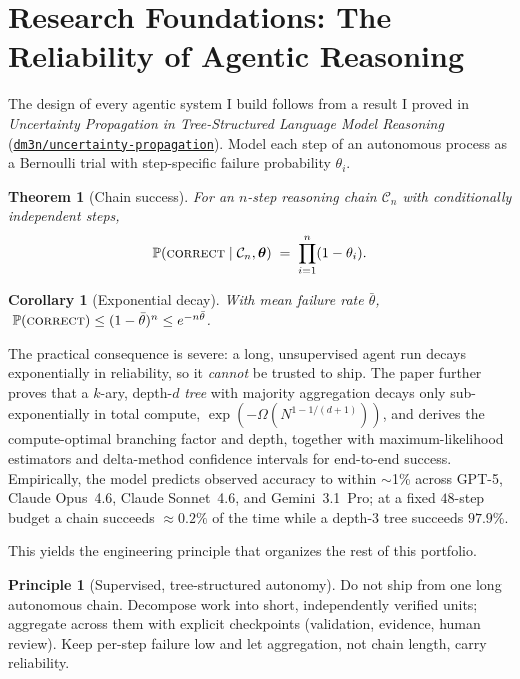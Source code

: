 \documentclass[11pt]{article}
\theoremstyle{plain}
\newtheorem{theorem}{Theorem}
\newtheorem{corollary}{Corollary}
\theoremstyle{definition}
\newtheorem{principle}{Principle}
\newcommand{\repo}[1]{\href{https://github.com/dm3n/#1}{\nolinkurl{dm3n/#1}}}
\begin{document}
\section{Research Foundations: The Reliability of Agentic Reasoning}
\label{sec:research}
The design of every agentic system I build follows from a result I proved in
\emph{Uncertainty Propagation in Tree-Structured Language Model Reasoning}
(\repo{uncertainty-propagation}). Model each step of an autonomous process as a Bernoulli
trial with step-specific failure probability $\theta_i$.

\begin{theorem}[Chain success]
For an $n$-step reasoning chain $\mathcal{C}_n$ with conditionally independent steps,
\[
  \mathbb{P}(\textsc{correct}\mid \mathcal{C}_n,\boldsymbol{\theta}) \;=\; \prod_{i=1}^{n}(1-\theta_i).
\]
\end{theorem}

\begin{corollary}[Exponential decay]
With mean failure rate $\bar\theta$, $\;\mathbb{P}(\textsc{correct}) \le (1-\bar\theta)^n \le e^{-n\bar\theta}$.
\end{corollary}

The practical consequence is severe: a long, unsupervised agent run decays exponentially in
reliability, so it \emph{cannot} be trusted to ship. The paper further proves that a
$k$-ary, depth-$d$ \emph{tree} with majority aggregation decays only sub-exponentially in
total compute, $\exp(-\Omega(N^{1-1/(d+1)}))$, and derives the compute-optimal branching
factor and depth, together with maximum-likelihood estimators and delta-method confidence
intervals for end-to-end success. Empirically, the model predicts observed accuracy to
within $\sim$1\% across GPT-5, Claude Opus~4.6, Claude Sonnet~4.6, and Gemini~3.1~Pro; at a
fixed $48$-step budget a chain succeeds $\approx 0.2\%$ of the time while a depth-3 tree
succeeds $97.9\%$.

This yields the engineering principle that organizes the rest of this portfolio.

\begin{principle}[Supervised, tree-structured autonomy]
Do not ship from one long autonomous chain. Decompose work into short, independently
verified units; aggregate across them with explicit checkpoints (validation, evidence,
human review). Keep per-step failure low and let aggregation, not chain length, carry
reliability.
\end{principle}
\end{document}

